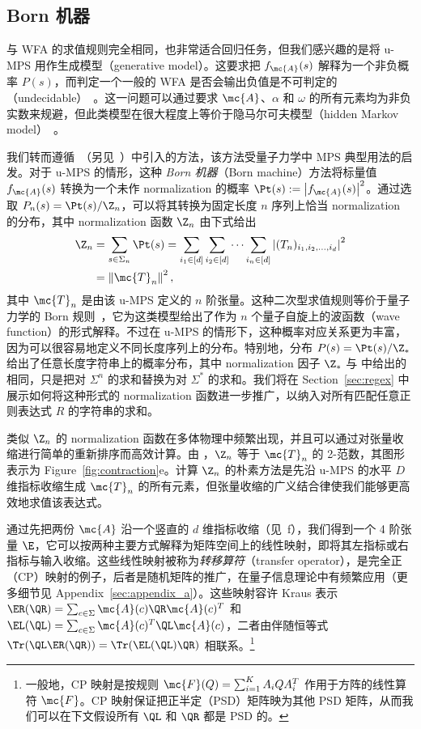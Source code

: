 \subsection{Born 机器}

 与 WFA 的求值规则完全相同，也非常适合回归任务，但我们感兴趣的是将 u-MPS 用作生成模型（generative model）。这要求把 $f_{\mc{A}}(s)$ 解释为一个非负概率 $P(s)$，而判定一个一般的 WFA 是否会输出负值是不可判定的（undecidable）~\citep{denis2008}。这一问题可以通过要求 $\mc{A}$、$\alpha$ 和 $\omega$ 的所有元素均为非负实数来规避，但此类模型在很大程度上等价于隐马尔可夫模型（hidden Markov model）~\citep{denis2008}。

我们转而遵循~\citep{pestun2017a}（另见~\citep{han2018}）中引入的方法，该方法受量子力学中 MPS 典型用法的启发。对于 u-MPS 的情形，这种 \emph{Born 机器}（Born machine）方法将标量值 $f_{\mc{A}}(s)$ 转换为一个未作 normalization 的概率 $\Pt(s) := \left|f_{\mc{A}}(s)\right|^2$。通过选取 $P_n(s) = \Pt(s) / \Z_n$，可以将其转换为固定长度 $n$ 序列上恰当 normalization 的分布，其中 normalization 函数 $\Z_n$ 由下式给出
%
\begin{align}
\label{eq:partition_n}
\Z_n &= \sum_{s \in \Sigma_n} \Pt(s) = \sum_{i_1\in[d]} \sum_{i_2\in[d]} \cdots \sum_{i_n\in[d]} \left| (T_n)_{i_1,i_2,\ldots,i_d} \right|^2 \nonumber\\
&= \left\lVert\mc{T}_n\right\rVert^2,
\end{align}
%
其中 $\mc{T}_n$ 是由该 u-MPS 定义的 $n$ 阶张量。这种二次型求值规则等价于量子力学的 Born 规则~\citep{born1926}，它为这类模型给出了作为 $n$ 个量子自旋上的波函数（wave function）的形式解释。不过在 u-MPS 的情形下，这种概率对应关系更为丰富，因为可以很容易地定义不同长度序列上的分布。特别地，分布 $P(s) = \Pt(s) / \Z_*$ 给出了任意长度字符串上的概率分布，其中 normalization 因子 $\Z_*$ 与  中给出的相同，只是把对 $\Sigma^n$ 的求和替换为对 $\Sigma^*$ 的求和。我们将在 Section~\ref{sec:regex} 中展示如何将这种形式的 normalization 函数进一步推广，以纳入对所有匹配任意正则表达式 $R$ 的字符串的求和。

类似 $\Z_n$ 的 normalization 函数在多体物理中频繁出现，并且可以通过对张量收缩进行简单的重新排序而高效计算。由 ，$\Z_n$ 等于 $\mc{T}_n$ 的 2-范数，其图形表示为 Figure~\ref{fig:contraction}e。计算 $\Z_n$ 的朴素方法是先沿 u-MPS 的水平 $D$ 维指标收缩生成 $\mc{T}_n$ 的所有元素，但张量收缩的广义结合律使我们能够更高效地求值该表达式。

通过先把两份 $\mc{A}$ 沿一个竖直的 $d$ 维指标收缩（见~f），我们得到一个 4 阶张量 $\E$，它可以按两种主要方式解释为矩阵空间上的线性映射，即将其左指标或右指标与输入收缩。这些线性映射被称为\emph{转移算符}（transfer operator），是完全正（CP）映射的例子，后者是随机矩阵的推广，在量子信息理论中有频繁应用（更多细节见 Appendix~\ref{sec:appendix_a}）。这些映射容许 Kraus 表示 $\ER(\QR) = \sum_{c\in\Sigma} \mc{A}(c) \QR \mc{A}(c)^T$ 和 $\EL(\QL) = \sum_{c\in\Sigma} \mc{A}(c)^T \QL \mc{A}(c)$，二者由伴随恒等式 $\Tr(\QL \ER(\QR)) = \Tr(\EL(\QL) \QR)$ 相联系。\footnote{一般地，CP 映射是按规则 $\mc{F}(Q) = \sum_{i=1}^K A_i Q A_i^T$ 作用于方阵的线性算符 $\mc{F}$。CP 映射保证把正半定（PSD）矩阵映为其他 PSD 矩阵，从而我们可以在下文假设所有 $\QL$ 和 $\QR$ 都是 PSD 的。}

